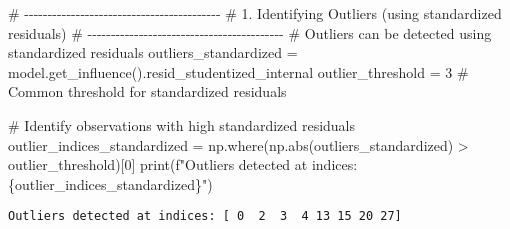 \documentclass[
  letterpaper,
  DIV=11,
  numbers=noendperiod]{scrreprt}
\newenvironment{Shaded}{\begin{snugshade}}{\end{snugshade}}
\newcommand{\BuiltInTok}[1]{\textcolor[rgb]{0.00,0.23,0.31}{#1}}
\newcommand{\CommentTok}[1]{\textcolor[rgb]{0.37,0.37,0.37}{#1}}
\newcommand{\DecValTok}[1]{\textcolor[rgb]{0.68,0.00,0.00}{#1}}
\newcommand{\NormalTok}[1]{\textcolor[rgb]{0.00,0.23,0.31}{#1}}
\newcommand{\OperatorTok}[1]{\textcolor[rgb]{0.37,0.37,0.37}{#1}}
\newcommand{\SpecialCharTok}[1]{\textcolor[rgb]{0.37,0.37,0.37}{#1}}
\newcommand{\SpecialStringTok}[1]{\textcolor[rgb]{0.13,0.47,0.30}{#1}}
\begin{document}
\begin{Shaded}
\begin{Highlighting}[]
\CommentTok{\# {-}{-}{-}{-}{-}{-}{-}{-}{-}{-}{-}{-}{-}{-}{-}{-}{-}{-}{-}{-}{-}{-}{-}{-}{-}{-}{-}{-}{-}{-}{-}{-}{-}{-}{-}{-}{-}{-}{-}{-}{-}{-}}
\CommentTok{\# 1. Identifying Outliers (using standardized residuals)}
\CommentTok{\# {-}{-}{-}{-}{-}{-}{-}{-}{-}{-}{-}{-}{-}{-}{-}{-}{-}{-}{-}{-}{-}{-}{-}{-}{-}{-}{-}{-}{-}{-}{-}{-}{-}{-}{-}{-}{-}{-}{-}{-}{-}{-}}
\CommentTok{\# Outliers can be detected using standardized  residuals}
\NormalTok{outliers\_standardized }\OperatorTok{=}\NormalTok{ model.get\_influence().resid\_studentized\_internal}
\NormalTok{outlier\_threshold }\OperatorTok{=} \DecValTok{3}  \CommentTok{\# Common threshold for standardized residuals}
\end{Highlighting}
\end{Shaded}

\begin{Shaded}
\begin{Highlighting}[]
\CommentTok{\# Identify observations with high standardized residuals}
\NormalTok{outlier\_indices\_standardized }\OperatorTok{=}\NormalTok{ np.where(np.}\BuiltInTok{abs}\NormalTok{(outliers\_standardized) }\OperatorTok{\textgreater{}}\NormalTok{ outlier\_threshold)[}\DecValTok{0}\NormalTok{]}
\BuiltInTok{print}\NormalTok{(}\SpecialStringTok{f"Outliers detected at indices: }\SpecialCharTok{\{}\NormalTok{outlier\_indices\_standardized}\SpecialCharTok{\}}\SpecialStringTok{"}\NormalTok{)}
\end{Highlighting}
\end{Shaded}

\begin{verbatim}
Outliers detected at indices: [ 0  2  3  4 13 15 20 27]
\end{verbatim}
\end{document}
